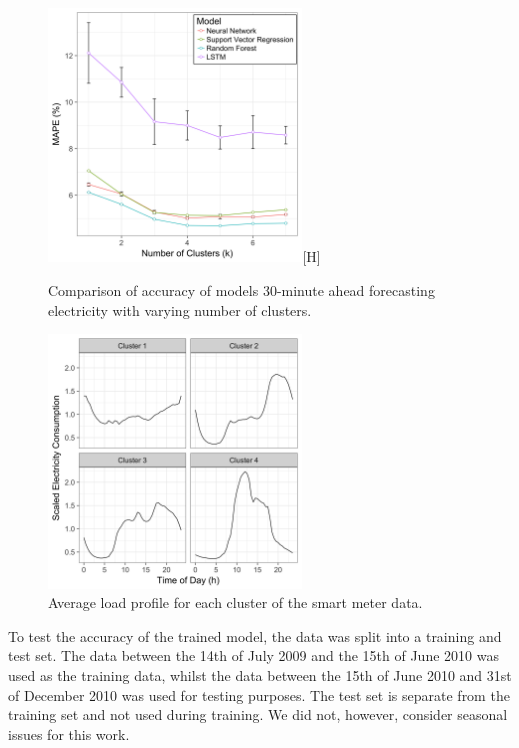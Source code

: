 \begin{figure}
	\centering
	\includegraphics[width=0.6\textwidth]{Chapter5/figures/short-term-forecasting/results.png}[H]
	\caption{Comparison of accuracy of models 30-minute ahead forecasting electricity with varying number of clusters.}
	\label{fig:results}
\end{figure}

\begin{figure}
	\centering
	\includegraphics[width=0.6\textwidth]{Chapter5/figures/short-term-forecasting/Cluster_Centres.png}
	\caption{Average load profile for each cluster of the smart meter data.}
	\label{fig:clustercentre}
\end{figure}

To test the accuracy of the trained model, the data was split into a training and test set. The data between the 14th of July 2009 and the 15th of June 2010 was used as the training data, whilst the data between the 15th of June 2010 and 31st of December 2010 was used for testing purposes. The test set is separate from the training set and not used during training. We did not, however, consider seasonal issues for this work.

